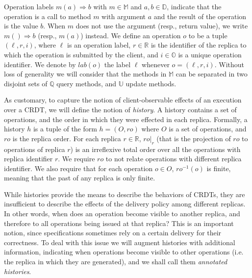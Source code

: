 Operation labels \mbox{$m(a)\Rightarrow b$} with $m \in \mathbb{M}$ and $a,b \in
\mathbb{D}$, indicate that the operation is a call to method $m$
with argument $a$ and the result of the operation is the value
$b$.
When $m$ does not use the argument (resp., return value), we write
$m()\Rightarrow b$ (resp., $m(a)$) instead.
We define an operation $o$ to be a tuple $(\ell,r,i)$, where $\ell$ is
an operation label, $r \in \mathbb{R}$ is the identifier of the
replica to which the operation is submitted by the client, and $i \in \mathbb{O}$ is a
unique operation identifier.
We denote by $\mathit{lab}(o)$ the label $\ell$ whenever $o = (\ell,
r, i)$.
%
Without loss of generality we will consider that the methods in
$\mathbb{M}$ can be separated in two disjoint sets of $\mathbb{Q}$
query methods, and $\mathbb{U}$ update methods.

As customary, to capture the notion of client-observable effects of an
execution over a CRDT, we will define the notion of \emph{history}.
%
A history contains a set of operations, and the order in which
they were effected in each replica.
%
Formally, a history $h$ is a tuple of the form $h = (O,\mathit{ro})$
where $O$ is a set of operations, and $\mathit{ro}$ is the replica
order.
%
For each replica $r \in \mathbb{R}$, $\mathit{ro}|_{r}$ (that is the
projection of $ro$ to operations of replica $r$) is an irreflexive
total order over all the operations with replica identifier $r$.
%
We require $\mathit{ro}$ to not relate operations with different replica identifier.
%
We also require that for each operation $o \in O$,
$\mathit{ro}^{-1}(o)$ is finite, meaning that the past of any replica
is only finite.

While histories provide the means to describe the behaviors of CRDTs,
they are insufficient to describe the effects of the delivery
policy among different replicas.
%
In other words, when does an operation become visible to another
replica, and therefore to all operations being issued at that replica?
%
This is an important notion, since specifications sometimes rely on a
certain delivery for their correctness.
%
To deal with this issue we will augment histories with additional
information, indicating when operations become visible to other
operations (i.e. the replica in which they are generated), and we
shall call them \emph{annotated histories}.
%

